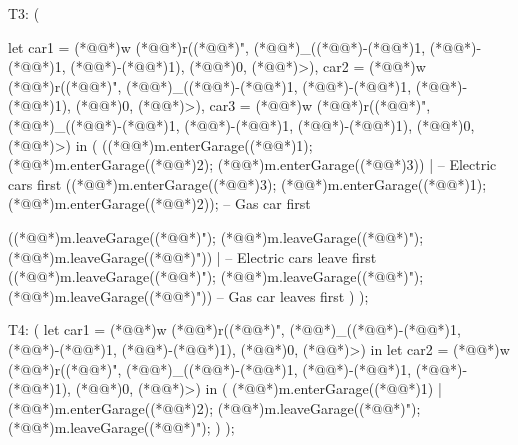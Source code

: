 \documentclass[a4paper]{article}
\begin{document}
\begin{vdm_al}
T3:
(
    
    let car1 = (*@@*)w (*@@*)r((*@@*)", (*@@*)_((*@\vdmnotcovered{}@*)-(*@\vdmnotcovered{}@*)1, (*@\vdmnotcovered{}@*)-(*@\vdmnotcovered{}@*)1, (*@\vdmnotcovered{}@*)-(*@\vdmnotcovered{}@*)1), (*@\vdmnotcovered{}@*)0, (*@@*)>),
        car2 = (*@@*)w (*@@*)r((*@@*)", (*@@*)_((*@\vdmnotcovered{}@*)-(*@\vdmnotcovered{}@*)1, (*@\vdmnotcovered{}@*)-(*@\vdmnotcovered{}@*)1, (*@\vdmnotcovered{}@*)-(*@\vdmnotcovered{}@*)1), (*@\vdmnotcovered{}@*)0, (*@@*)>),
        car3 = (*@@*)w (*@@*)r((*@@*)", (*@@*)_((*@\vdmnotcovered{}@*)-(*@\vdmnotcovered{}@*)1, (*@\vdmnotcovered{}@*)-(*@\vdmnotcovered{}@*)1, (*@\vdmnotcovered{}@*)-(*@\vdmnotcovered{}@*)1), (*@\vdmnotcovered{}@*)0, (*@@*)>) in
    (
        ((*@@*)m.enterGarage((*@@*)1); (*@@*)m.enterGarage((*@@*)2); (*@@*)m.enterGarage((*@@*)3)) |  -- Electric cars first
        ((*@@*)m.enterGarage((*@@*)3); (*@@*)m.enterGarage((*@@*)1); (*@@*)m.enterGarage((*@@*)2));  -- Gas car first

        ((*@@*)m.leaveGarage((*@@*)"); (*@@*)m.leaveGarage((*@@*)"); (*@@*)m.leaveGarage((*@@*)")) |  -- Electric cars leave first
        ((*@@*)m.leaveGarage((*@@*)"); (*@@*)m.leaveGarage((*@@*)"); (*@@*)m.leaveGarage((*@@*)"))   -- Gas car leaves first
    )
);

T4:
(
    let car1 = (*@@*)w (*@@*)r((*@@*)", (*@@*)_((*@\vdmnotcovered{}@*)-(*@\vdmnotcovered{}@*)1, (*@\vdmnotcovered{}@*)-(*@\vdmnotcovered{}@*)1, (*@\vdmnotcovered{}@*)-(*@\vdmnotcovered{}@*)1), (*@\vdmnotcovered{}@*)0, (*@@*)>) in
    let car2 = (*@@*)w (*@@*)r((*@@*)", (*@@*)_((*@\vdmnotcovered{}@*)-(*@\vdmnotcovered{}@*)1, (*@\vdmnotcovered{}@*)-(*@\vdmnotcovered{}@*)1, (*@\vdmnotcovered{}@*)-(*@\vdmnotcovered{}@*)1), (*@\vdmnotcovered{}@*)0, (*@@*)>) in
    (
        (*@@*)m.enterGarage((*@@*)1) | (*@@*)m.enterGarage((*@@*)2);
        (*@@*)m.leaveGarage((*@@*)");
        (*@@*)m.leaveGarage((*@@*)");
    )
);


\end{vdm_al}
\end{document}
